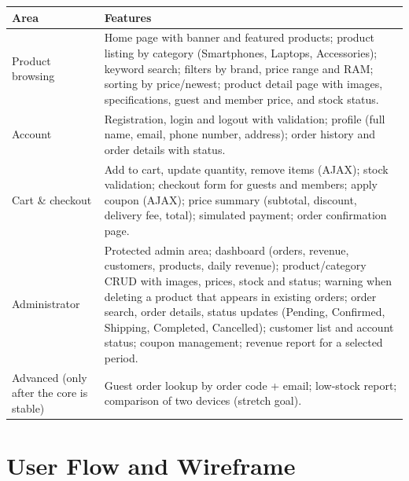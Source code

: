 \documentclass[12pt,a4paper]{article}
\begin{document}
\begin{tabularx}{\linewidth}{|L{3.2cm}|Y|}
\hline
{} \textbf{Area} & \textbf{Features} \\ \hline \endhead
Product browsing & Home page with banner and featured products; product listing by category
           (Smartphones, Laptops, Accessories); keyword search; filters by brand, price range and RAM;
           sorting by price/newest; product detail page with images, specifications, guest and member
           price, and stock status. \\ \hline
Account    & Registration, login and logout with validation; profile (full name, email, phone number,
           address); order history and order details with status. \\ \hline
Cart \& checkout & Add to cart, update quantity, remove items (AJAX); stock validation;
           checkout form for guests and members; apply coupon (AJAX); price summary (subtotal,
           discount, delivery fee, total); simulated payment; order confirmation page. \\ \hline
Administrator & Protected admin area; dashboard (orders, revenue, customers, products, daily revenue);
           product/category CRUD with images, prices, stock and status; warning when deleting a product
           that appears in existing orders; order search, order details, status updates (Pending,
           Confirmed, Shipping, Completed, Cancelled); customer list and account status; coupon
           management; revenue report for a selected period. \\ \hline
Advanced (only after the core is stable) & Guest order lookup by order code + email;
           low-stock report; comparison of two devices (stretch goal). \\ \hline
\end{tabularx}

\section{User Flow and Wireframe}
\end{document}
